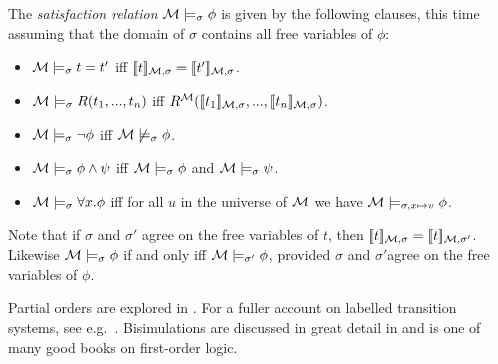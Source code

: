 \begin{definition}
\begin{itemize}
\end{itemize}

\NI The \emph{satisfaction relation} $\mathcal{M} \models_{\sigma} \phi$
is given by the following clauses, this time assuming that the domain
of $\sigma$ contains all free variables of $\phi$:
\begin{itemize}

\item $\mathcal{M} \models_{\sigma} t = t'$ iff $\lbrack\!\lbrack t \rbrack\!\rbrack_{\mathcal{M}, \sigma} = \lbrack\!\lbrack t' \rbrack\!\rbrack_{\mathcal{M}, \sigma}$.
\item $\mathcal{M} \models_{\sigma} R(t_1, ..., t_n)$ iff
  $R^{\mathcal{M}}(\lbrack\!\lbrack t_1 \rbrack\!\rbrack_{\mathcal{M}, \sigma}, ..., \lbrack\!\lbrack t_n \rbrack\!\rbrack_{\mathcal{M},
  \sigma})$.
\item $\mathcal{M} \models_{\sigma} \neg \phi$ iff $\mathcal{M} \not\models_{\sigma} \phi$.
\item $\mathcal{M} \models_{\sigma} \phi \land \psi$ iff $\mathcal{M} \models_{\sigma} \phi$ and $\mathcal{M} \models_{\sigma} \psi$.
\item $\mathcal{M} \models_{\sigma} \forall x.\phi$ iff for all $u$ in the
  universe of $\mathcal{M}$ we have $\mathcal{M} \models_{\sigma, x \mapsto v} \phi$.

\end{itemize}

\NI Note that if $\sigma$ and $\sigma'$ agree on the free variables of
$t$, then $\lbrack\!\lbrack t \rbrack\!\rbrack_{\mathcal{M}, \sigma} =\lbrack\!\lbrack t \rbrack\!\rbrack_{\mathcal{M},
  \sigma'}$. Likewise $\mathcal{M} \models_{\sigma} \phi$ if and only iff
$\mathcal{M} \models_{\sigma'} \phi$, provided $\sigma$ and $\sigma'$agree
on the free variables of $\phi$.

\end{definition}

\NI Partial orders are explored in \cite{DaveyBA:intlatao}. For a
fuller account on labelled transition systems, see
e.g.~\cite{SassoneV:modcontac,HennessyM:Algtheop}. Bisimulations are
discussed in great detail in \cite{SangiorgiD:intbisac} and
\cite{EndertonHB:matinttl} is one of many good books on first-order
logic.

